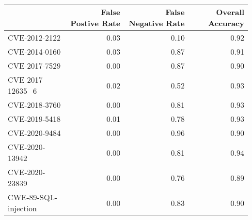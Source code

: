 \begin{tabular}{lrrr}
\toprule
{} &  False Postive Rate &  False Negative Rate &  Overall Accuracy \\
\midrule
CVE-2012-2122        &                0.03 &                 0.10 &              0.92 \\
CVE-2014-0160        &                0.03 &                 0.87 &              0.91 \\
CVE-2017-7529        &                0.00 &                 0.87 &              0.90 \\
CVE-2017-12635\_6     &                0.02 &                 0.52 &              0.93 \\
CVE-2018-3760        &                0.00 &                 0.81 &              0.93 \\
CVE-2019-5418        &                0.01 &                 0.78 &              0.93 \\
CVE-2020-9484        &                0.00 &                 0.96 &              0.90 \\
CVE-2020-13942       &                0.00 &                 0.81 &              0.94 \\
CVE-2020-23839       &                0.00 &                 0.76 &              0.89 \\
CWE-89-SQL-injection &                0.00 &                 0.83 &              0.90 \\
\bottomrule
\end{tabular}
